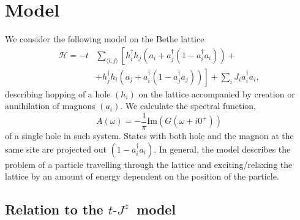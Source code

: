 \documentclass[%
 reprint,
 amsmath,amssymb,
 aps,
prb,
floatfix,
]{revtex4-1}
\newcommand{\mean}[1]{\langle#1\rangle}
\begin{document}
\section{Model}

We consider the following model on the Bethe lattice
\begin{equation}\label{model}
\begin{aligned}
\mathcal{H} = -t &\sum_{\mean{i,j}} \left[ h_i^\dag h_j \left(a_i + a_j^\dag (1 - a_i^\dag a_i) \right)\right. + \\
&+ \left. h_j^\dag h_i \left(a_j + a_i^\dag (1 - a_j^\dag a_j) \right)\right] + \sum_i J_i a_i^\dag a_i,
\end{aligned}
\end{equation}
describing hopping of a hole $(h_i)$ on the lattice accompanied by creation or annihilation of magnons $(a_i)$. We calculate the spectral function,
\begin{equation}
A(\omega) = -\frac{1}{\pi}\text{Im}\!\left(G(\omega + i0^+)\right)
\end{equation}
of a single hole in such system. States with both hole and the magnon at the same site are projected out $(1 - a_i^\dag a_i)$. In general, the model describes the problem of a particle travelling through the lattice and exciting/relaxing the lattice by an amount of energy dependent on the position of the particle. 

\subsection{Relation to the $t\text{-}J^z$~model}
 
\end{document}
